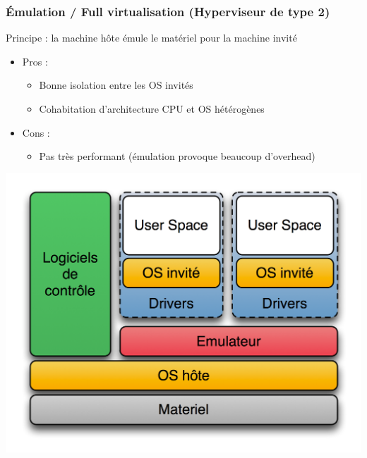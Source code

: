   \begin{frame}
    \frametitle{Émulation / Full virtualisation (Hyperviseur de type 2)}
    Principe : la machine hôte émule le matériel pour la machine invité
    \begin{itemize}
      \item Pros :
      \begin{itemize}
        \item Bonne isolation entre les OS invités
        \item Cohabitation d'architecture CPU et OS hétérogènes
      \end{itemize}
      \item Cons :
      \begin{itemize}
        \item Pas très performant (émulation provoque beaucoup d'overhead)
      \end{itemize}
    \end{itemize}
    \begin{center}
      \includegraphics[width=0.5\linewidth]{images/Diagramme_ArchiEmulateur.png}
    \end{center}
  \end{frame}
  
